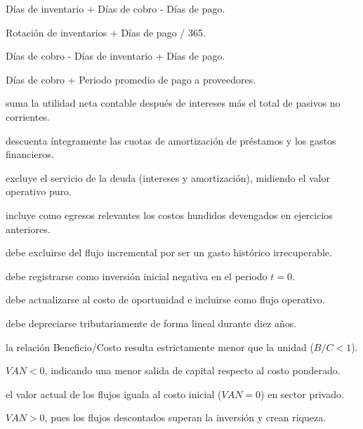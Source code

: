 \begin{opts}
    \item Días de inventario + Días de cobro - Días de pago.
    \item Rotación de inventarios + Días de pago / 365.
    \item Días de cobro - Días de inventario + Días de pago.
    \item Días de cobro + Periodo promedio de pago a proveedores.
\end{opts}

\begin{opts}
    \item suma la utilidad neta contable después de intereses más el total de pasivos no corrientes.
    \item descuenta íntegramente las cuotas de amortización de préstamos y los gastos financieros.
    \item excluye el servicio de la deuda (intereses y amortización), midiendo el valor operativo puro.
    \item incluye como egresos relevantes los costos hundidos devengados en ejercicios anteriores.
\end{opts}

\begin{opts}
    \item debe excluirse del flujo incremental por ser un gasto histórico irrecuperable.
    \item debe registrarse como inversión inicial negativa en el periodo $t=0$.
    \item debe actualizarse al costo de oportunidad e incluirse como flujo operativo.
    \item debe depreciarse tributariamente de forma lineal durante diez años.
\end{opts}

\begin{opts}
    \item la relación Beneficio/Costo resulta estrictamente menor que la unidad ($B/C < 1$).
    \item $VAN < 0$, indicando una menor salida de capital respecto al costo ponderado.
    \item el valor actual de los flujos iguala al costo inicial ($VAN = 0$) en sector privado.
    \item $VAN > 0$, pues los flujos descontados superan la inversión y crean riqueza.
\end{opts}

